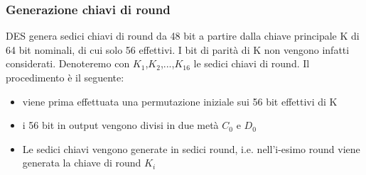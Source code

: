 \subsubsection{Generazione chiavi di round}
DES genera sedici chiavi di round da 48 bit a partire dalla chiave principale K di 64 bit nominali, di cui solo 56 effettivi. I bit di parità di K non vengono infatti considerati. Denoteremo con $K_{1}$,$K_{2}$,...,$K_{16}$ le sedici chiavi di round. Il procedimento è il seguente:
\begin{itemize}
  \item viene prima effettuata una permutazione iniziale sui 56 bit effettivi di K
  \item i 56 bit in output vengono divisi in due metà $C_{0}$ e $D_{0}$
  \item Le sedici chiavi vengono generate in sedici round, i.e. nell'i-esimo round viene generata la chiave di round $K_{i}$
\end{itemize}
